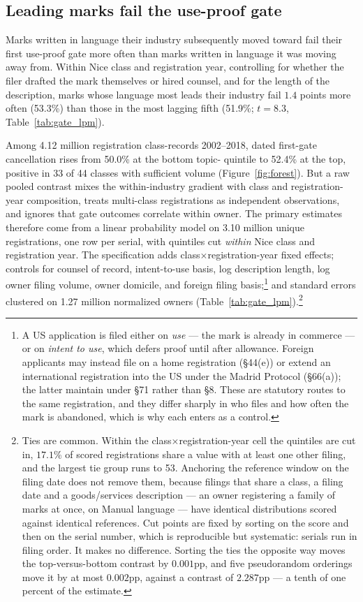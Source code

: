 \subsection{Leading marks fail the use-proof gate}\label{sec:gate}

Marks written in language their industry subsequently moved toward fail
their first use-proof gate more often than marks written in language it was
moving away from. Within Nice class and registration year, controlling for whether the
filer drafted the mark themselves or hired counsel, and for the length of the
description, marks whose language most leads their industry fail $1.4$
points more often (53.3\%) than those in the most lagging fifth (51.9\%;
$t = 8.3$, Table~\ref{tab:gate_lpm}).

Among 4.12 million registration class-records 2002--2018, dated first-gate cancellation rises from 50.0\%
at the bottom topic-\dkl{} quintile to 52.4\% at the top, positive in 33
of 44 classes with sufficient volume (Figure~\ref{fig:forest}). But a raw
pooled contrast mixes the within-industry gradient with class and registration-year
composition, treats multi-class registrations as independent observations,
and ignores that gate outcomes correlate within owner. The
primary estimates therefore come from a linear probability model on 3.10
million unique registrations, one row per serial, with \dkl{} quintiles cut
\emph{within} Nice class and registration year. The specification adds
class$\times$registration-year fixed effects; controls for counsel of record,
intent-to-use basis, log description length, log owner filing volume, owner
domicile, and foreign filing basis;\footnote{A US application is filed
either on \emph{use} --- the mark is already in commerce --- or on
\emph{intent to use}, which defers proof until after allowance. Foreign
applicants may instead file on a home registration (\S44(e)) or extend an
international registration into the US under the Madrid Protocol
(\S66(a)); the latter maintain under \S71 rather than \S8. These are
statutory routes to the same registration, and they differ sharply in who
files and how often the mark is abandoned, which is why each enters as a
control.} and standard errors clustered on 1.27
million normalized owners (Table~\ref{tab:gate_lpm}).\footnote{Ties are
common. Within the class$\times$registration-year cell the quintiles are cut in,
$17.1$\% of scored registrations share a \dkl{} value with at least one
other filing, and the largest tie group runs to 53. Anchoring the reference
window on the filing date does not remove them, because filings that share a
class, a filing date and a goods/services description --- an owner
registering a family of marks at once, on Manual language --- have identical
distributions scored against identical references. Cut points are fixed by
sorting on the score and then on the serial number, which is reproducible
but systematic: serials run in filing order. It makes no difference. Sorting
the ties the opposite way moves the top-versus-bottom contrast by $0.001$pp,
and five pseudorandom orderings move it by at most $0.002$pp, against a
contrast of $2.287$pp --- a tenth of one percent of the estimate.}

